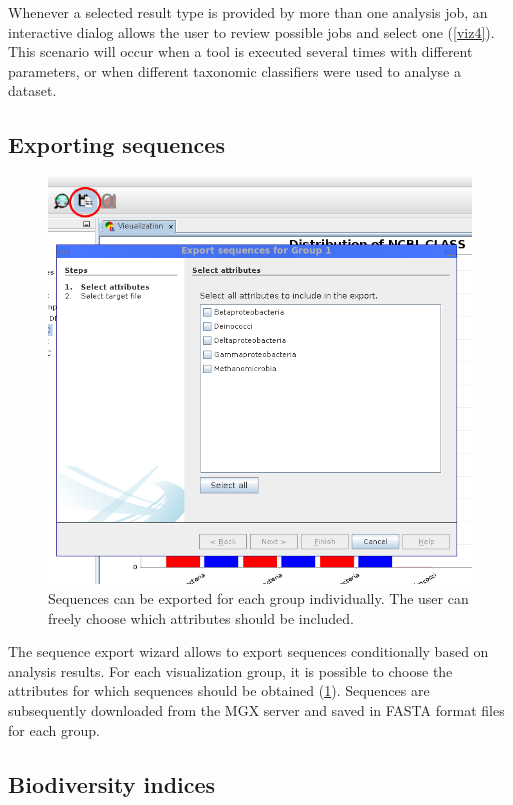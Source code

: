 Whenever a selected result type is provided by more than one analysis job, an interactive dialog allows the user to
review possible jobs and select one (\ref{viz4}). This scenario will occur when a tool is executed several 
times with different parameters, or when different taxonomic classifiers were used to analyse a dataset.

\subsection{Exporting sequences}

\begin{figure}[H]
\centering
\includegraphics[width=.8\textwidth]{img/mgx/SeqExport}
\caption[Exporting sequences]{Sequences can be exported for each group individually. The user can freely choose
which attributes should be included.}
\label{seqexp}
\end{figure}

The sequence export wizard allows to export sequences conditionally based on analysis results. For each
visualization group, it is possible to choose the attributes for which sequences should be obtained (\ref{seqexp}).
Sequences are subsequently downloaded from the MGX server and saved in FASTA format files for each group.


\subsection{Biodiversity indices}

